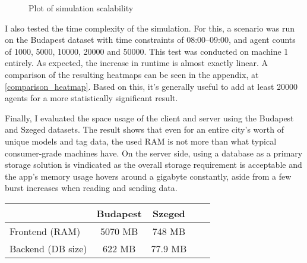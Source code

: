 \begin{figure}[h]
    \centering
    \caption{Plot of simulation scalability}
\end{figure}

\label{perftesting-heatmap}
I also tested the time complexity of the simulation. For this, a scenario was run on the Budapest dataset with time constraints of 08:00--09:00, and agent counts of 1000, 5000, 10000, 20000 and 50000. This test was conducted on machine 1 entirely. As expected, the increase in runtime is almost exactly linear. A comparison of the resulting heatmaps can be seen in the appendix, at \ref{comparison_heatmap}. Based on this, it's generally useful to add at least 20000 agents for a more statistically significant result.

Finally, I evaluated the space usage of the client and server using the Budapest and Szeged datasets. The result shows that even for an entire city's worth of unique models and tag data, the used RAM is not more than what typical consumer-grade machines have. On the server side, using a database as a primary storage solution is vindicated as the overall storage requirement is acceptable and the app's memory usage hovers around a gigabyte constantly, aside from a few burst increases when reading and sending data.

\begin{center}
    \begin{tabular}{l|cc|cc}
        \multicolumn{1}{c}{} & \multicolumn{1}{c}{Budapest} & \multicolumn{1}{c}{Szeged} \\
        \hline
        Frontend (RAM) & 5070 MB & 748 MB \\
        Backend (DB size) & 622 MB & 77.9 MB \\
        \end{tabular}
\end{center}

